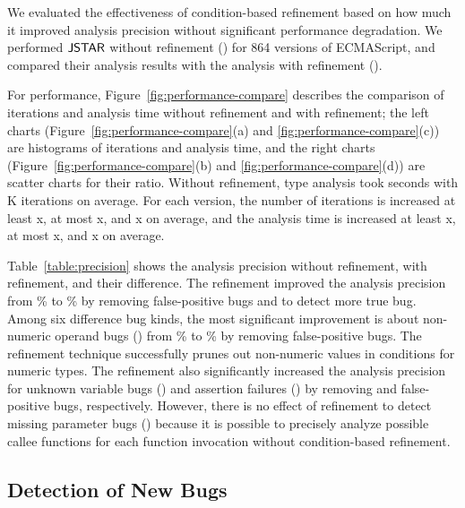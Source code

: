 We evaluated the effectiveness of condition-based refinement based on how much
it improved analysis precision without significant performance degradation.  We
performed $\tool$ without refinement () for 864 versions of
ECMAScript, and compared their analysis results with the analysis with
refinement ().

For performance, Figure~\ref{fig:performance-compare} describes the comparison
of iterations and analysis time without refinement and with refinement; the left
charts (Figure~\ref{fig:performance-compare}(a) and
\ref{fig:performance-compare}(c)) are histograms of iterations and analysis
time, and the right charts (Figure~\ref{fig:performance-compare}(b) and
\ref{fig:performance-compare}(d)) are scatter charts for their ratio.  Without
refinement, type analysis took  seconds with K
iterations on average.  For each version, the number of iterations is increased
at least x, at most x, and x on average, and
the analysis time is increased at least x, at most x,
and x on average.

Table~\ref{table:precision} shows the analysis precision without refinement,
with refinement, and their difference.  The refinement improved the analysis
precision from \% to \% by removing 
false-positive bugs and to detect  more true bug.  Among six
difference bug kinds, the most significant improvement is about non-numeric
operand bugs () from \% to \%
by removing  false-positive bugs.  The refinement technique
successfully prunes out non-numeric values in conditions for numeric types.
The refinement also significantly increased the analysis precision for unknown
variable bugs () and assertion failures
() by removing  and  false-positive bugs,
respectively.  However, there is no effect of refinement to detect missing
parameter bugs () because it is possible to precisely analyze
possible callee functions for each function invocation without condition-based
refinement.


\subsection{Detection of New Bugs}\label{sec:new-bug}

